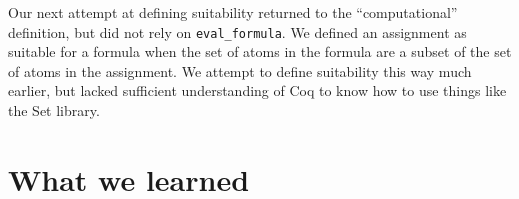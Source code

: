 \documentclass{article}
\begin{document}
Our next attempt at defining suitability returned to the ``computational'' definition, but did not rely on \verb|eval_formula|. We defined an assignment as suitable for a formula when the set of atoms in the formula are a subset of the set of atoms in the assignment. We attempt to define suitability this way much earlier, but lacked sufficient understanding of Coq to know how to use things like the Set library. 



\section{What we learned}
\end{document}
